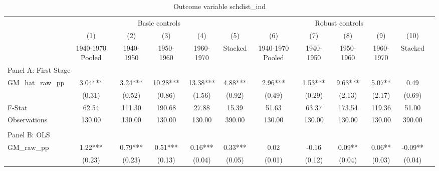  \begin{table}[htbp]\centering {} \begin{threeparttable} \caption{Outcome variable schdist\_ind} \begin{tabular}{l*{11}{c}} \toprule
          &\multicolumn{5}{c}{Basic controls}                                   &\multicolumn{5}{c}{Robust controls}                                  \\\cmidrule(lr){2-6}\cmidrule(lr){7-11}
          &\multicolumn{1}{c}{(1)}&\multicolumn{1}{c}{(2)}&\multicolumn{1}{c}{(3)}&\multicolumn{1}{c}{(4)}&\multicolumn{1}{c}{(5)}&\multicolumn{1}{c}{(6)}&\multicolumn{1}{c}{(7)}&\multicolumn{1}{c}{(8)}&\multicolumn{1}{c}{(9)}&\multicolumn{1}{c}{(10)}\\
          &\multicolumn{1}{c}{1940-1970 Pooled}&\multicolumn{1}{c}{1940-1950}&\multicolumn{1}{c}{1950-1960}&\multicolumn{1}{c}{1960-1970}&\multicolumn{1}{c}{Stacked}&\multicolumn{1}{c}{1940-1970 Pooled}&\multicolumn{1}{c}{1940-1950}&\multicolumn{1}{c}{1950-1960}&\multicolumn{1}{c}{1960-1970}&\multicolumn{1}{c}{Stacked}\\
\cmidrule(lr){1-11}
\multicolumn{10}{l}{Panel A: First Stage}\\
\cmidrule(lr){1-11}
GM\_hat\_raw\_pp&      3.04***&      3.24***&     10.28***&     13.38***&      4.88***&      2.96***&      1.53***&      9.63***&      5.07** &      0.49   \\
          &    (0.31)   &    (0.52)   &    (0.86)   &    (1.56)   &    (0.92)   &    (0.49)   &    (0.29)   &    (2.13)   &    (2.17)   &    (0.69)   \\
\midrule
F-Stat    &     62.54   &    111.30   &    190.68   &     27.88   &     15.39   &     51.63   &     63.37   &    173.54   &    119.36   &     51.00   \\
Observations&    130.00   &    130.00   &    130.00   &    130.00   &    390.00   &    130.00   &    130.00   &    130.00   &    130.00   &    390.00   \\
\cmidrule[\heavyrulewidth](lr){1-11} \\ \cmidrule[\heavyrulewidth](lr){1-11}
\multicolumn{10}{l}{Panel B: OLS}\\
\cmidrule(lr){1-11}
GM\_raw\_pp &      1.22***&      0.79***&      0.51***&      0.16***&      0.33***&      0.02   &     -0.16   &      0.09** &      0.06** &     -0.09** \\
          &    (0.23)   &    (0.23)   &    (0.13)   &    (0.04)   &    (0.05)   &    (0.01)   &    (0.12)   &    (0.04)   &    (0.03)   &    (0.04)   \\

\end{tabular}
\end{threeparttable}
\end{table}
